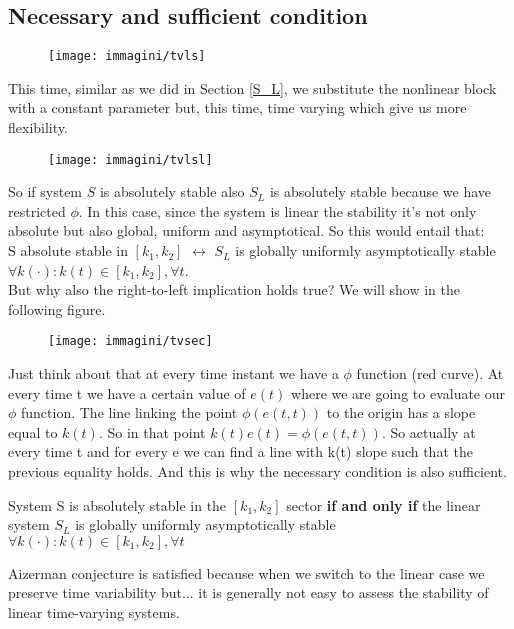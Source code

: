\subsection{Necessary and sufficient condition}
\begin{figure}[H]
	\centering
	\texttt{[image: immagini/tvls]}
	\label{fig:tvls}
\end{figure}
This time, similar as we did in Section \ref{S_L}, we substitute the nonlinear block with a constant parameter but, this time, time varying which give us more flexibility.
\begin{figure}[H]
	\centering
	\texttt{[image: immagini/tvlsl]}
	\label{fig:tvlsl}
\end{figure}
So if system $S$ is absolutely stable also $S_L$ is absolutely stable because we have restricted $\phi$. In this case, since the system is linear the stability it's not only absolute but also global, uniform and asymptotical. So this would entail that:\\
S absolute stable in $[k_1,k_2]$ $\leftrightarrow$ $S_L$ is globally uniformly asymptotically stable $\forall k(\cdot)\colon k(t) \in [k_1,k_2], \forall t$.\\But why also the right-to-left implication holds true? We will show in  the following figure.
\begin{figure}[H]
	\centering
	\texttt{[image: immagini/tvsec]}
	\label{fig:tvsec}
\end{figure}
Just think about that at every time instant we have a $\phi$ function (red curve). At every time t we have a certain value of $e(t)$ where we are going to evaluate our $\phi$ function. The line linking the point $\phi(e(t,t))$ to the origin has a slope equal to $k(t)$. So in that point $k(t)e(t)=\phi(e(t,t))$. So actually at every time t and for every e we can find a line with k(t) slope such that the previous equality holds. And this is why the necessary condition is also sufficient.
\begin{thm}
	System S is absolutely stable in the $[k_1, k_2]$ sector \textbf{if and only if} the linear system $S_L$ is globally uniformly asymptotically stable $\forall k(\cdot)\colon k(t) \in [k_1,k_2], \forall t$
\end{thm}
\begin{note}
	Aizerman conjecture is satisfied because when we switch to the linear case we preserve time variability but... it is generally not easy to assess the stability of linear time-varying systems.
\end{note}

